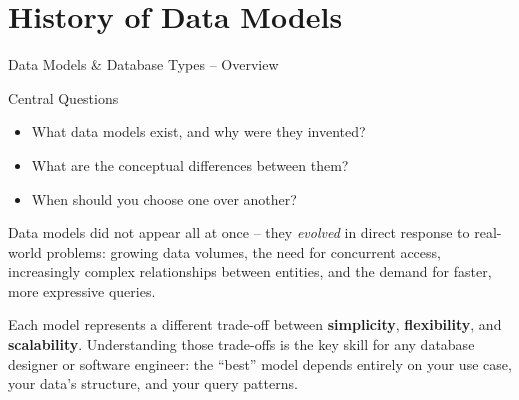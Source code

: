\section{History of Data Models}

\begin{frame}{Data Models \& Database Types -- Overview}
  \begin{block}{Central Questions}
    \begin{itemize}
      \item What data models exist, and why were they invented?
      \item What are the conceptual differences between them?
      \item When should you choose one over another?
    \end{itemize}
  \end{block}

  Data models did not appear all at once -- they \emph{evolved} in direct response to
  real-world problems: growing data volumes, the need for concurrent access,
  increasingly complex relationships between entities, and the demand for faster,
  more expressive queries.

  \medskip
  Each model represents a different trade-off between \textbf{simplicity},
  \textbf{flexibility}, and \textbf{scalability}.  Understanding those trade-offs
  is the key skill for any database designer or software engineer:
  the ``best'' model depends entirely on your use case, your data's structure,
  and your query patterns.
\end{frame}

